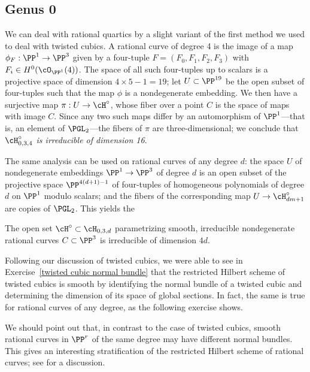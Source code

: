 \subsection{Genus 0}\label{degree 4 genus 0}

We can deal with rational quartics by a slight variant of the first method we used to deal with twisted cubics. A rational curve of degree 4 is the image of a map $\phi_F : \PP^1 \to \PP^3$ given by a four-tuple $F = (F_0,F_1,F_2,F_3)$ with $F_i \in H^0(\cO_{\PP^1}(4))$. The space of all such four-tuples up to scalars is a projective space of dimension $4 \times 5 - 1 = 19$; let $U \subset \PP^{19}$ be the open subset of four-tuples such that the map $\phi$ is a nondegenerate embedding. We then have a surjective map $\pi : U \to \cH^\circ$, whose fiber over a point $C$ is the space of maps with image $C$. Since any two such maps differ by an automorphism of $\PP^1$---that is, an element of $\PGL_2$---the fibers of $\pi$ are three-dimensional; we conclude that \emph{$\cH^\circ_{0,3,4}$ is irreducible of dimension 16}. 

The same analysis can be used on rational curves of any degree $d$: the space $U$ of nondegenerate embeddings $\PP^1 \to \PP^3$ of degree $d$ is an open subset of the projective space $\PP^{4(d+1)-1}$ of four-tuples of homogeneous polynomials of degree $d$ on $\PP^1$ modulo scalars; and the fibers of the corresponding map $U \to \cH^\circ_{dm+1}$ are copies of $\PGL_2$. This yields the

\begin{proposition}\label{dimension of rational curves}
The open set $\cH^\circ \subset \cH_{0,3,d}$ parametrizing smooth, irreducible nondegenerate rational curves $C \subset \PP^3$ is irreducible of dimension $4d$.
\end{proposition}


Following our discussion of twisted cubics, we were able to see in Exercise~\ref{twisted cubic normal bundle} that the restricted Hilbert scheme of twisted cubics is smooth by identifying the normal bundle of a twisted cubic and determining the dimension of its space of global sections. In fact, the same is true for rational curves of any degree, as the following exercise shows.

We should point out that, in contrast to the case of twisted cubics, smooth rational curves in $\PP^r$ of the same degree may have different normal bundles. This gives an interesting stratification of the restricted Hilbert scheme of rational curves; see \cite{Riedl} for a discussion.

